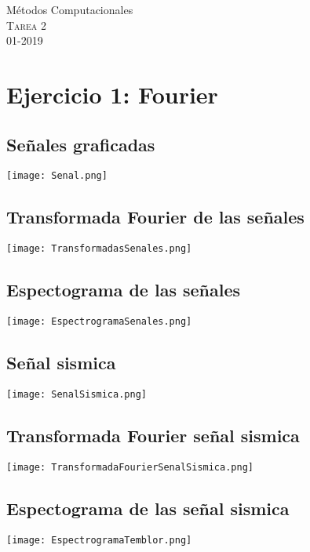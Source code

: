 \documentclass[11pt,letterpaper]{exam}
\begin{document}
\begin{center}
{\Large Métodos Computacionales} \\
\textsc{Tarea 2}\\
01-2019\\
\end{center}

\noindent

\section{Ejercicio 1: Fourier}

\subsection{ Señales graficadas}
\texttt{[image: Senal.png]}

\subsection{ Transformada Fourier de las señales}
\texttt{[image: TransformadasSenales.png]}

\subsection{ Espectograma de las señales}
\texttt{[image: EspectrogramaSenales.png]}

\subsection{ Señal sismica}
\texttt{[image: SenalSismica.png]}

\subsection{ Transformada Fourier señal sismica}
\texttt{[image: TransformadaFourierSenalSismica.png]}

\subsection{ Espectograma de las señal sismica}
\texttt{[image: EspectrogramaTemblor.png]}


\end{document}
